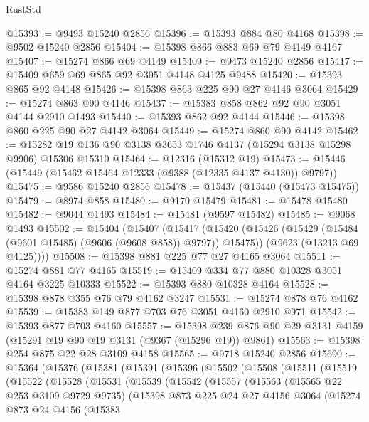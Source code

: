 \begin{lexlean}{RustStd}
\begin{coremodule}
@15393 := @9493 @15240 @2856
@15396 := @15393 @884 @80 @4168
@15398 := @9502 @15240 @2856
@15404 := @15398 @866 @883 @69 @79 @4149 @4167
@15407 := @15274 @866 @69 @4149
@15409 := @9473 @15240 @2856
@15417 := @15409 @659 @69 @865 @92 @3051 @4148 @4125 @9488
@15420 := @15393 @865 @92 @4148
@15426 := @15398 @863 @225 @90 @27 @4146 @3064
@15429 := @15274 @863 @90 @4146
@15437 := @15383 @858 @862 @92 @90 @3051 @4144 @2910 @1493
@15440 := @15393 @862 @92 @4144
@15446 := @15398 @860 @225 @90 @27 @4142 @3064
@15449 := @15274 @860 @90 @4142
@15462 := @15282 @19 @136 @90 @3138 @3653 @1746 @4137 (@15294 @3138 @15298 @9906) @15306 @15310
@15464 := @12316 (@15312 @19)
@15473 := @15446 (@15449 (@15462 @15464 @12333 (@9388 (@12335 @4137 @4130)) @9797))
@15475 := @9586 @15240 @2856
@15478 := @15437 (@15440 (@15473 @15475))
@15479 := @8974 @858
@15480 := @9170 @15479
@15481 := @15478 @15480
@15482 := @9044 @1493
@15484 := @15481 (@9597 @15482)
@15485 := @9068 @1493
@15502 := @15404
    (@15407
      (@15417
        (@15420 (@15426 (@15429 (@15484 (@9601 @15485) (@9606 (@9608 @858)) @9797)) @15475))
        (@9623 (@13213 @69 @4125))))
@15508 := @15398 @881 @225 @77 @27 @4165 @3064
@15511 := @15274 @881 @77 @4165
@15519 := @15409 @334 @77 @880 @10328 @3051 @4164 @3225 @10333
@15522 := @15393 @880 @10328 @4164
@15528 := @15398 @878 @355 @76 @79 @4162 @3247
@15531 := @15274 @878 @76 @4162
@15539 := @15383 @149 @877 @703 @76 @3051 @4160 @2910 @971
@15542 := @15393 @877 @703 @4160
@15557 := @15398 @239 @876 @90 @29 @3131 @4159 (@15291 @19 @90 @19 @3131 (@9367 (@15296 @19)) @9861)
@15563 := @15398 @254 @875 @22 @28 @3109 @4158
@15565 := @9718 @15240 @2856
@15690 := @15364
    (@15376
      (@15381
        (@15391
          (@15396
            (@15502
              (@15508
                (@15511
                  (@15519
                    (@15522
                      (@15528
                        (@15531
                          (@15539
                            (@15542
                              (@15557
                                (@15563
                                  (@15565 @22 @253 @3109 @9729 @9735)
                                  (@15398
                                    @873
                                    @225
                                    @24
                                    @27
                                    @4156
                                    @3064
                                    (@15274
                                      @873
                                      @24
                                      @4156
                                      (@15383

\end{coremodule}
\end{lexlean}
